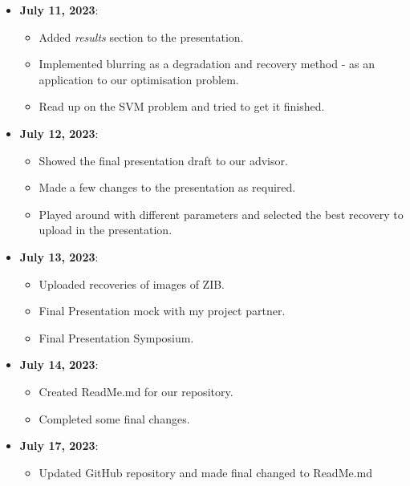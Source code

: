 \documentclass[a4paper,11pt,fleqn]{article}
\theoremstyle{plain}{\theorembodyfont{\rmfamily}%
\newtheorem{conjecture}[theorem]{Conjecture}}
\theoremstyle{plain}{\theorembodyfont{\rmfamily}%
\newtheorem{example}[theorem]{Example}}
\theoremstyle{plain}{\theorembodyfont{\rmfamily}%
\newtheorem{remark}[theorem]{Remark}}
\theoremstyle{plain}{\theorembodyfont{\rmfamily}%
\newtheorem{algorithm}[theorem]{Algorithm}}
\theoremstyle{plain}{\theorembodyfont{\rmfamily}%
\newtheorem{condition}[theorem]{Condition}}
\theoremstyle{plain}{\theorembodyfont{\rmfamily}%
\newtheorem{definition}[theorem]{Definition}}
\theoremstyle{plain}{\theorembodyfont{\rmfamily}
\newtheorem{fact}[theorem]{Fact}}
\theoremstyle{plain}{\theorembodyfont{\rmfamily}
\newtheorem{problem}[theorem]{Problem}}
\theoremstyle{plain}{\theorembodyfont{\rmfamily}
\newtheorem{notation}[theorem]{Notation}}
\theoremstyle{plain}{\theorembodyfont{\rmfamily}
\newtheorem{project}[theorem]{Project}}
\begin{document}
\begin{itemize}
\item {\bf July 11, 2023}:
\begin{itemize} 
\item Added \textit{results} section to the presentation.
\item Implemented blurring as a degradation and recovery method - as an application to our optimisation problem.
\item Read up on the SVM problem and tried to get it finished.
\end{itemize}

\item {\bf July 12, 2023}:
\begin{itemize} 
\item Showed the final presentation draft to our advisor. 
\item Made a few changes to the presentation as required.
\item Played around with different parameters and selected the best recovery to upload in the presentation.
\end{itemize}

\item {\bf July 13, 2023}:
\begin{itemize} 
\item Uploaded recoveries of images of ZIB.
\item Final Presentation mock with my project partner.
\item Final Presentation Symposium.
\end{itemize}

\item {\bf July 14, 2023}:
\begin{itemize} 
\item Created ReadMe.md for our repository.
\item Completed some final changes.
\end{itemize}

\item {\bf July 17, 2023}:
\begin{itemize}
    \item Updated GitHub repository and made final changed to ReadMe.md
\end{itemize}
\end{itemize}



\end{document}
